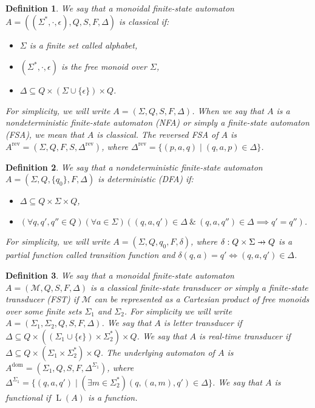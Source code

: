 \documentclass{article}
\newtheorem{definition}{Definition}[section]
\newcommand\pfun{\mathrel{\ooalign{\hfil$\mapstochar\mkern5mu$\hfil\cr$\to$\cr}}}
\DeclareMathOperator{\Lang}{L}
\begin{document}
	\begin{definition} \label{def:NFA}
		We say that a monoidal finite-state automaton $A = ((\Sigma^*, \cdot, \epsilon), Q, S, F, \Delta)$ is classical if:
		\begin{itemize}
			\item $\Sigma$ is a finite set called alphabet,
			\item $(\Sigma^*, \cdot, \epsilon)$ is the free monoid over $\Sigma$,
			\item $\Delta\subseteq Q\times (\Sigma\cup\{\epsilon\})\times Q$.
		\end{itemize}
		For simplicity, we will write $A = (\Sigma, Q, S, F, \Delta)$.
		When we say that $A$ is a nondeterministic finite-state automaton (NFA) or simply a finite-state automaton (FSA), we mean that $A$ is classical. The reversed FSA of $A$ is $A^\mathrm{rev} = (\Sigma, Q, F, S, \Delta^\mathrm{rev})$, where $\Delta^\mathrm{rev} = \{ (p, a, q) \mid (q, a, p)\in \Delta \}$.
	\end{definition}

	\begin{definition} \label{def:DFA}
		We say that a nondeterministic finite-state automaton $A = (\Sigma, Q, \{q_0\}, F, \Delta)$ is deterministic (DFA) if:
		\begin{itemize}
			\item $\Delta\subseteq Q\times \Sigma\times Q$,
			\item $(\forall q, q', q''\in Q)(\forall a\in \Sigma)
				((q, a, q')\in\Delta\ \&\ (q, a, q'')\in\Delta \implies q' = q'')$.
		\end{itemize}
		For simplicity, we will write $A = (\Sigma, Q, q_0, F, \delta)$, where $\delta: Q\times \Sigma\pfun Q$ is a partial function called transition function and $\delta(q, a) = q' \iff (q, a, q')\in\Delta$.
	\end{definition}

	\begin{definition} \label{def:FST}
		We say that a monoidal finite-state automaton $A = (\mathcal{M}, Q, S, F, \Delta)$ is a classical finite-state transducer or simply a finite-state transducer (FST) if $\mathcal{M}$ can be represented as a Cartesian product of free monoids over some finite sets $\Sigma_1$ and $\Sigma_2$.
		For simplicity we will write $A = (\Sigma_1, \Sigma_2, Q, S, F, \Delta)$.
		We say that $A$ is letter transducer if $\Delta\subseteq Q\times((\Sigma_1\cup\{\epsilon\})\times\Sigma_2^*)\times Q$. We say that $A$ is real-time transducer if $\Delta\subseteq Q\times(\Sigma_1\times\Sigma_2^*)\times Q$. The underlying automaton of $A$ is $A^\mathrm{dom} = (\Sigma_1, Q, S, F, \Delta^{\Sigma_1})$, where $\Delta^{\Sigma_1} = \{ (q, a, q')\mid (\exists m\in \Sigma_2^*)(q, (a, m), q')\in\Delta \}$. We say that $A$ is functional if $\Lang(A)$ is a function.
	\end{definition}
\end{document}
